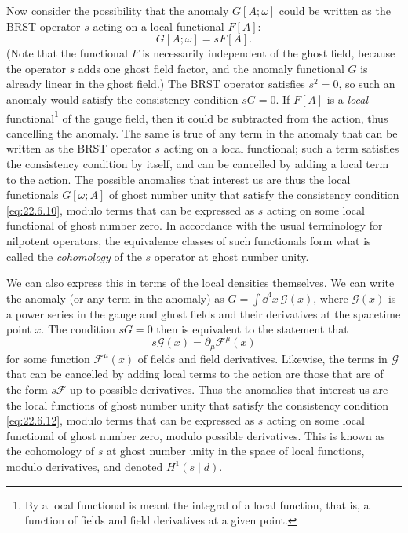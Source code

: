Now consider the possibility that the anomaly $G[A;\omega]$ could be
written as the BRST operator $s$ acting on a local functional $F[A]$:
\begin{equation}
 G[A;\omega]=sF[A].
 \tag{22.6.11}\label{eq:22.6.11}
\end{equation}
(Note that the functional $F$ is necessarily independent of the ghost
field, because the operator $s$ adds one ghost field factor, and the
anomaly functional $G$ is already linear in the ghost field.) The BRST
operator satisfies $s^2=0$, so such an anomaly would satisfy the
consistency condition $sG=0$. If $F[A]$ is a \emph{local}
functional\footnote{By a local functional is meant the integral of a local
function, that is, a function of fields and field derivatives at a given
point.} of the gauge field, then it could be subtracted from the action,
thus cancelling the anomaly. The same is true of any term in the anomaly
that can be written as the BRST operator $s$ acting on a local functional;
such a term satisfies the consistency condition by itself, and can be
cancelled by adding a local term to the action. The possible anomalies
that interest us are thus the local functionals $G[\omega;A]$ of ghost
number unity that satisfy the consistency condition \eqref{eq:22.6.10},
modulo terms that can be expressed as $s$ acting on some local functional
of ghost number zero. In accordance with the usual terminology for
nilpotent operators, the equivalence classes of such functionals form what
is called the \emph{cohomology} of the $s$ operator at ghost number unity.

We can also express this in terms of the local densities themselves. We
can write the anomaly (or any term in the anomaly) as
$G=\int \dd^4x\,\mathcal G(x)$, where $\mathcal G(x)$ is a power series in
the gauge and ghost fields and their derivatives at the spacetime point
$x$. The condition $sG=0$ then is equivalent to the statement that
\begin{equation}
 s\mathcal G(x)=\partial_\mu\mathcal F^\mu(x)
 \tag{22.6.12}\label{eq:22.6.12}
\end{equation}
for some function $\mathcal F^\mu(x)$ of fields and field derivatives.
Likewise, the terms in $\mathcal G$ that can be cancelled by adding local
terms to the action are those that are of the form $s\mathcal F$ up to
possible derivatives. Thus the anomalies that interest us are the local
functions of ghost number unity that satisfy the consistency condition
\eqref{eq:22.6.12}, modulo terms that can be expressed as $s$ acting on
some local functional of ghost number zero, modulo possible derivatives.
This is known as the cohomology of $s$ at ghost number unity in the space
of local functions, modulo derivatives, and denoted $H^1(s\mathbin{|}d)$.

